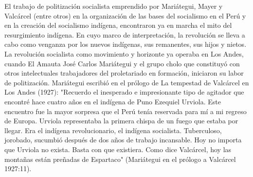 \documentclass[]{interact}
\theoremstyle{plain}%
\theoremstyle{definition}
\theoremstyle{remark}
\begin{document}
El trabajo de politización socialista emprendido por Mariátegui, Mayer y Valcárcel (entre otros) en la organización de las bases del socialismo en el Perú y en la creación del socialismo indígena, encontraron ya en marcha el mito del resurgimiento indígena. En cuyo marco de interpretación, la revolución se lleva a cabo como venganza por los nuevos indígenas, sus remanentes, sus hijos y nietos. La revolución socialista como movimiento y horizonte ya operaba en Los Andes, cuando El Amauta José Carlos Mariátegui y el grupo cholo que constituyó con otros intelectuales trabajadores del proletariado en formación, iniciaron su labor de politización. Mariátegui escribió en el prólogo de La tempestad de Valcárcel en Los Andes (1927): "Recuerdo el inesperado e impresionante tipo de agitador que encontré hace cuatro años en el indígena de Puno Ezequiel Urviola. Este encuentro fue la mayor sorpresa que el Perú tenía reservada para mí a mi regreso de Europa. Urviola representaba la primera chispa de un fuego que estaba por llegar. Era el indígena revolucionario, el indígena socialista. Tuberculoso, jorobado, sucumbió después de dos años de trabajo incansable. Hoy no importa que Urviola no exista. Basta con que existiera. Como dice Valcárcel, hoy las montañas están preñadas de Espartaco" (Mariátegui en el prólogo a Valcárcel 1927:11). 
\end{document}

